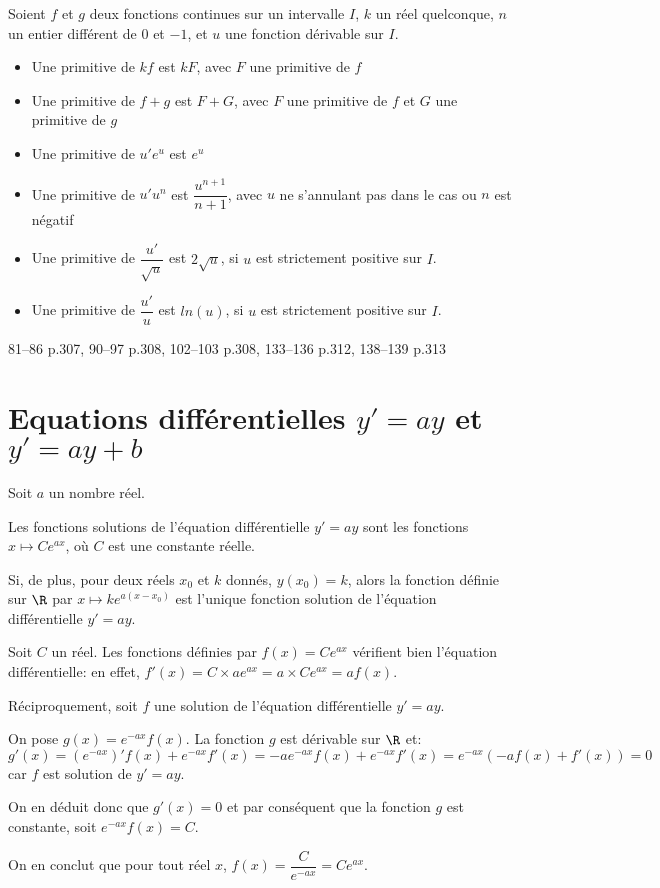 \documentclass[a4paper]{article}
\begin{document}
\begin{propriete}{}{}
  Soient $f$ et $g$ deux fonctions continues sur un intervalle $I$, $k$ un réel quelconque, $n$ un entier différent de $0$ et $-1$, et $u$ une fonction dérivable sur $I$.
  \begin{itemize}[label=\textbullet]
    \item Une primitive de $kf$ est $kF$, avec $F$ une primitive de $f$
    \item Une primitive de $f+g$ est $F+G$, avec $F$ une primitive de $f$ et $G$ une primitive de $g$
    \item Une primitive de $u'e^u$ est $e^u$
    \item Une primitive de $u'u^n$ est $\dfrac{u^{n+1}}{n+1}$, avec $u$ ne s'annulant pas dans le cas ou $n$ est négatif
    \item Une primitive de $\dfrac{u'}{\sqrt{u}}$ est $2\sqrt{u}$, si $u$ est strictement positive sur $I$.
    \item Une primitive de $\dfrac{u'}{u}$ est $ln(u)$, si $u$ est strictement positive sur $I$.
  \end{itemize} 
\end{propriete}

\begin{exercices}{}{}
  81--86 p.307, 90--97 p.308, 102--103 p.308, 133--136 p.312, 138--139 p.313
\end{exercices}


\pagebreak

\section{Equations différentielles $y'=ay$ et $y'=ay+b$}
    \begin{theoreme}{}{}
    Soit $a$ un nombre réel.

    Les fonctions solutions de l'équation différentielle $y'=ay$ sont les fonctions $x\mapsto Ce^{ax}$, où 
    $C$ est une constante réelle.

    Si, de plus, pour deux réels $x_0$ et $k$ donnés, $y(x_0)=k$, alors la fonction 
    définie sur $\R$ par $x \mapsto ke^{a(x-x_0)}$ est l'unique fonction solution de l'équation différentielle $y'=ay$.
    \end{theoreme}

    \begin{demonstrationp}{}{}
      Soit $C$ un réel. Les fonctions définies par $f(x)=Ce^{ax}$ vérifient bien l'équation différentielle: en effet,
      $f'(x)=C\times a e^{ax}=a\times Ce^{ax}=af(x)$.

      Réciproquement, soit $f$ une solution de l'équation différentielle $y'=ay$.

      On pose $g(x)=e^{-ax}f(x)$. La fonction $g$ est dérivable sur $\R$ et: $g'(x)=(e^{-ax})'f(x)+e^{-ax}f'(x)=
      -a e^{-ax}f(x)+e^{-ax}f'(x)=e^{-ax}\left( -af(x)+f'(x)\right)=0$ car $f$ est solution de $y'=ay$.

      On en déduit donc que $g'(x)=0$ et par conséquent que la fonction $g$ est constante, soit $e^{-ax}f(x)=C$.

      On en conclut que pour tout réel $x$, $f(x)=\dfrac{C}{e^{-ax}}=Ce^{ax}$.
      \findemo{}
    \end{demonstrationp}
\end{document}
